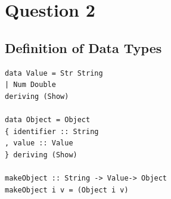 \documentclass[a4paper]{article}
\begin{document}
\section{Question 2}
\subsection{Definition of Data Types}
\begin{lstlisting}[frame=single]
data Value = Str String
| Num Double
deriving (Show)

data Object = Object 
{ identifier :: String
, value :: Value
} deriving (Show)

makeObject :: String -> Value-> Object
makeObject i v = (Object i v)
\end{lstlisting}
\end{document}
